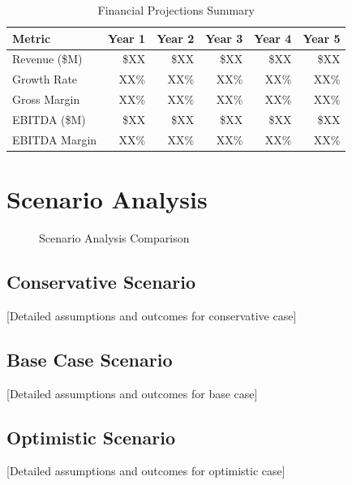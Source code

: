 \documentclass[11pt,letterpaper]{report}
\begin{document}
\begin{table}[htbp]
\centering
\caption{Financial Projections Summary}
\begin{tabular}{@{}lrrrrr@{}}
\toprule
\textbf{Metric} & \textbf{Year 1} & \textbf{Year 2} & \textbf{Year 3} & \textbf{Year 4} & \textbf{Year 5} \\
\midrule
Revenue (\$M) & \$XX & \$XX & \$XX & \$XX & \$XX \\
\rowcolor{tablealt} Growth Rate & XX\% & XX\% & XX\% & XX\% & XX\% \\
Gross Margin & XX\% & XX\% & XX\% & XX\% & XX\% \\
\rowcolor{tablealt} EBITDA (\$M) & \$XX & \$XX & \$XX & \$XX & \$XX \\
EBITDA Margin & XX\% & XX\% & XX\% & XX\% & XX\% \\
\bottomrule
\end{tabular}
\label{tab:financials}
\end{table}

\section{Scenario Analysis}


\begin{figure}[htbp]
\centering
\caption{Scenario Analysis Comparison}
\label{fig:scenarios}
\end{figure}

\subsection{Conservative Scenario}
[Detailed assumptions and outcomes for conservative case]

\subsection{Base Case Scenario}
[Detailed assumptions and outcomes for base case]

\subsection{Optimistic Scenario}
[Detailed assumptions and outcomes for optimistic case]
\end{document}
